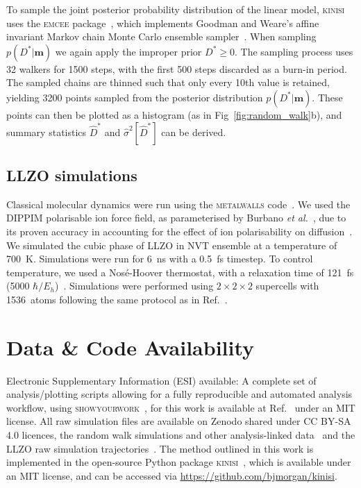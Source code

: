 \documentclass[reprint,superscriptaddress,nobibnotes,amsmath,amssymb,aps,prx,hidelinks,linenumbers]{revtex4-2}
\newcommand{\model}{\bm{m}}
\newcommand{\prob}[1]{\ensuremath{p(#1)}}
\newcommand{\Dest}{\ensuremath{\widehat{D}^*}}
\newcommand{\D}{\ensuremath{D^*}}
\newcommand{\varest}[1]{\ensuremath{\widehat{\sigma}^2[#1]}}
\begin{document}
To sample the joint posterior probability distribution of the linear model, \textsc{kinisi} uses the \textsc{emcee} package~\cite{foremanmackey_emcee_2019}, which implements Goodman and Weare's affine invariant Markov chain Monte Carlo ensemble sampler~\cite{goodman_ensemble_2010}. 
When sampling $\prob{\D|\model}$ we again apply the improper prior $\D \ge 0$.
The sampling process uses \num{32} walkers for \num{1500} steps, with the first \num{500} steps discarded as a burn-in period.
The sampled chains are thinned such that only every 10th value is retained, yielding \num{3200} points sampled from the posterior distribution $\prob{\D|\model}$.
These points can then be plotted as a histogram (as in Fig~\ref{fig:random_walk}b), and summary statistics $\Dest$ and $\varest{\Dest}$ can be derived.

\subsection{LLZO simulations}
Classical molecular dynamics were run using the \textsc{metalwalls} code~\cite{marin_metalwalls_2020}. 
We used the DIPPIM polarisable ion force field, as parameterised by Burbano \emph{et al.}~\cite{burbano_sparse_2016}, due to its proven accuracy in accounting for the effect of ion polarisability on diffusion~\cite{wilson_polarization_1993,burbano_sparse_2016}. 
We simulated the cubic phase of LLZO in NVT ensemble at a temperature of \SI{700}{\kelvin}.
Simulations were run for \SI{6}{\nano\second} with a \SI{0.5}{\femto\second} timestep. 
To control temperature, we used a Nos\'{e}-Hoover thermostat, with a relaxation time of \SI{121}{\femto\second} (5000 $\hbar / E_{h}$)~\cite{nose_unified_1984,hoover_canonical_1985,martyna_nose_1992}. 
Simulations were performed using $2 \times 2 \times 2$ supercells with \SI{1536}{atoms} following the same protocol as in Ref.~.

\section*{Data \& Code Availability}

Electronic Supplementary Information (ESI) available: A complete set of analysis/plotting scripts allowing for a fully reproducible and automated analysis workflow, using \textsc{showyourwork}~\cite{luger_showyourwork_2021}, for this work is available at Ref.~\cite{mccluskey_github_2022} under an MIT license.
All raw simulation files are available on Zenodo shared under CC BY-SA 4.0 licences, the random walk simulations and other analysis-linked data~\cite{mccluskey_zenodo_2022} and the LLZO raw simulation trajectories~\cite{coles_llzo_zenodo_2022}.
The method outlined in this work is implemented in the open-source Python package \textsc{kinisi}~\cite{mccluskey_kinisi_2022}, which is available under an MIT license, and can be accessed via \url{https://github.com/bjmorgan/kinisi}.
\end{document}
